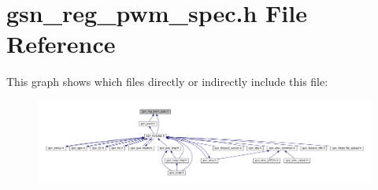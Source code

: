 \hypertarget{a00565}{
\section{gsn\_\-reg\_\-pwm\_\-spec.h File Reference}
\label{a00565}
}
This graph shows which files directly or indirectly include this file:
\nopagebreak
\begin{figure}[H]
\begin{center}
\leavevmode
\includegraphics[width=400pt]{a00802}
\end{center}
\end{figure}
